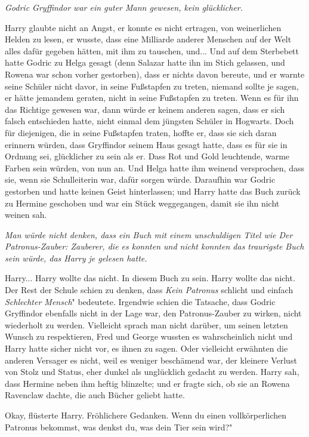 \emph{Godric Gryffindor war ein guter Mann gewesen, kein glücklicher.}

Harry glaubte nicht an Angst, er konnte es nicht ertragen, von weinerlichen
Helden zu lesen, er wusste, dass eine Milliarde anderer Menschen auf der Welt
alles dafür gegeben hätten, mit ihm zu tauschen, und... Und auf dem Sterbebett
hatte Godric zu Helga gesagt (denn Salazar hatte ihn im Stich gelassen, und
Rowena war schon vorher gestorben), dass er nichts davon bereute, und er warnte
seine Schüler nicht davor, in seine Fußstapfen zu treten, niemand sollte je
sagen, er hätte jemandem geraten, nicht in seine Fußstapfen zu treten. Wenn es
für ihn das Richtige gewesen war, dann würde er keinem anderen sagen, dass er
sich falsch entschieden hatte, nicht einmal dem jüngsten Schüler in Hogwarts.
Doch für diejenigen, die in seine Fußstapfen traten, hoffte er, dass sie sich
daran erinnern würden, dass Gryffindor seinem Haus gesagt hatte, dass es für sie
in Ordnung sei, glücklicher zu sein als er. Dass Rot und Gold leuchtende, warme
Farben sein würden, von nun an. Und Helga hatte ihm weinend versprochen, dass
sie, wenn sie Schulleiterin war, dafür sorgen würde. Daraufhin war Godric
gestorben und hatte keinen Geist hinterlassen; und Harry hatte das Buch zurück
zu Hermine geschoben und war ein Stück weggegangen, damit sie ihn nicht weinen
sah.

\emph{Man würde nicht denken, dass ein Buch mit einem unschuldigen Titel wie
\glqq{}Der Patronus-Zauber: Zauberer, die es konnten und nicht konnten\grqq{} das
traurigste Buch sein würde, das Harry je gelesen hatte.}

Harry... Harry wollte das nicht. In diesem Buch zu sein. Harry wollte das nicht.
Der Rest der Schule schien zu denken, dass \glqq{}\emph{Kein Patronus}\grqq{}
schlicht und einfach \glqq{}\emph{Schlechter Mensch}" bedeutete. Irgendwie schien
die Tatsache, dass Godric Gryffindor ebenfalls nicht in der Lage war, den
Patronus-Zauber zu wirken, nicht wiederholt zu werden. Vielleicht sprach man
nicht darüber, um seinen letzten Wunsch zu respektieren, Fred und George wussten
es wahrscheinlich nicht und Harry hatte sicher nicht vor, es ihnen zu sagen.
Oder vielleicht erwähnten die anderen Versager es nicht, weil es weniger
beschämend war, der kleinere Verlust von Stolz und Status, eher dunkel als
unglücklich gedacht zu werden. Harry sah, dass Hermine neben ihm heftig
blinzelte; und er fragte sich, ob sie an Rowena Ravenclaw dachte, die auch
Bücher geliebt hatte.

\glqq{}Okay\grqq{}, flüsterte Harry. \glqq{}Fröhlichere Gedanken. Wenn du einen
vollkörperlichen Patronus bekommst, was denkst du, was dein Tier sein wird?"

